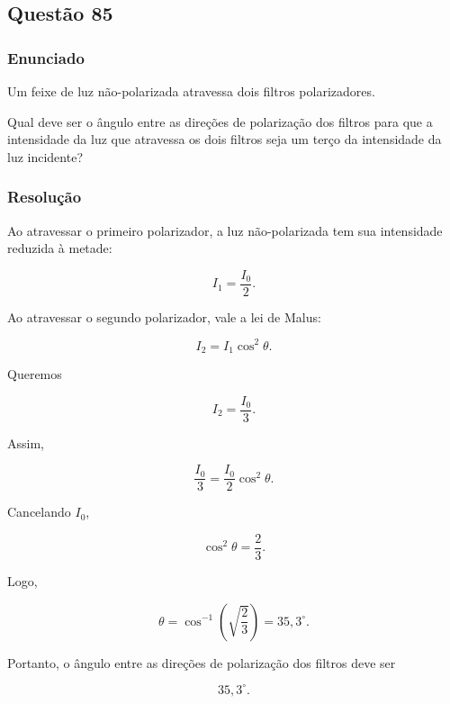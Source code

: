 \subsection{Questão 85}

\subsubsection{Enunciado}

Um feixe de luz não-polarizada atravessa dois filtros polarizadores.

Qual deve ser o ângulo entre as direções de polarização dos filtros para que a intensidade da luz que atravessa os dois filtros seja um terço da intensidade da luz incidente?


\subsubsection{Resolução}

Ao atravessar o primeiro polarizador, a luz não-polarizada tem sua intensidade
reduzida à metade:

\[
I_1=\frac{I_0}{2}.
\]

Ao atravessar o segundo polarizador, vale a lei de Malus:

\[
I_2=I_1\cos^2\theta.
\]

Queremos

\[
I_2=\frac{I_0}{3}.
\]

Assim,

\[
\frac{I_0}{3}
=
\frac{I_0}{2}\cos^2\theta.
\]

Cancelando \(I_0\),

\[
\cos^2\theta=\frac{2}{3}.
\]

Logo,

\[
\theta=\cos^{-1}\left(\sqrt{\frac{2}{3}}\right)
=35{,}3^\circ.
\]

Portanto, o ângulo entre as direções de polarização dos filtros deve ser

\[
\boxed{35{,}3^\circ}.
\]

\vspace{1cm}
